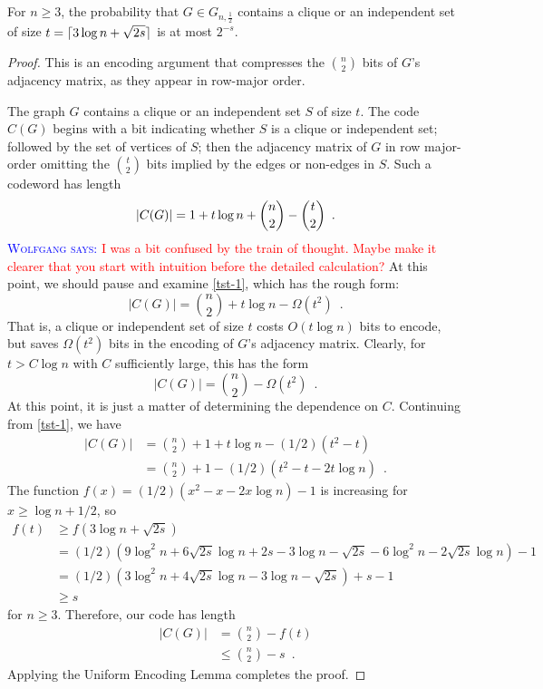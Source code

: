\documentclass{patmorin}
\newcommand{\aremark}[3]{\textcolor{blue}{\textsc{#1 #2:}}
  \textcolor{red}{\textsf{#3}}}
\newcommand{\wolfgang}[2][says]{\aremark{Wolfgang}{#1}{#2}}
\begin{document}
\begin{thm}
  For $n \ge 3$, the probability that $G \in G_{n,\frac{1}{2}}$
  contains a clique or an independent set of size $t = {\lceil 3\log n +
    \sqrt{2s} \rceil}$ is at most $2^{-s}$.
\end{thm}

\begin{proof}
  This is an encoding argument that compresses the $\binom{n}{2}$ bits
  of $G$'s adjacency matrix, as they appear in row-major order.
  
  The graph $G$ contains a clique or an independent set $S$ of size
  $t$. The code $C(G)$ begins with a bit indicating whether $S$
  is a clique or independent set; followed by the set of vertices of $S$; 
  then the
  adjacency matrix of $G$ in row major-order omitting
  the $\binom{t}{2}$ bits implied by the edges or non-edges in
  $S$. Such a codeword has length
  \begin{equation} 
    |C(G)|  = 1 + t\log n + \binom{n}{2}-\binom{t}{2} \enspace .  \eqlabel{tst-1}
  \end{equation}
  \wolfgang{I was a bit confused by the train of thought. Maybe 
    make it clearer that you start with intuition before the
    detailed calculation?}
  At this point, we should pause and examine \eqref{tst-1}, which has
  the rough form:
  \[ |C(G)|  = \binom{n}{2} + t\log n - \Omega(t^2) \enspace . \]
  That is, a clique or independent set of size $t$ costs $O(t\log n)$ bits
  to encode, but saves $\Omega(t^2)$ bits in the encoding of $G$'s 
  adjacency matrix.
  Clearly, for $t>C\log n$ with $C$ sufficiently large, this has the form 
  \[ |C(G)|  = \binom{n}{2} - \Omega(t^2) \enspace . \]
  At this point, it is just a matter of determining the dependence on $C$.
  Continuing from \eqref{tst-1}, we have
  \begin{align*}
    |C(G)| 
    & = \binom{n}{2} + 1 + t\log n - (1/2)(t^2 - t) \\
    & = \binom{n}{2} + 1 - (1/2)(t^2 - t - 2t \log n) \enspace .
  \end{align*}
  The function $f(x) = (1/2)(x^2 - x - 2x \log n) - 1$ is increasing
  for $x \geq \log n + 1/2$, so
  \begin{align*}
    f(t) &\ge f(3\log n + \sqrt{2s}) \\
    &= (1/2)(9 \log^2 n + 6 \sqrt{2s} \log n + 2s - 3 \log n - \sqrt{2s} - 6 \log^2 n - 2 \sqrt{2s} \log n) - 1 \\
    &= (1/2)(3 \log^2 n + 4 \sqrt{2s} \log n - 3 \log n - \sqrt{2s}) + s - 1 \\
    &\ge s
  \end{align*}
  for $n \ge 3$. Therefore, our code has length
  \begin{align*}
    |C(G)| & = \binom{n}{2} - f(t) \\
    & \le \binom{n}{2} - s \enspace .
  \end{align*}
  Applying the Uniform Encoding Lemma completes the proof.
\end{proof}
\end{document}
